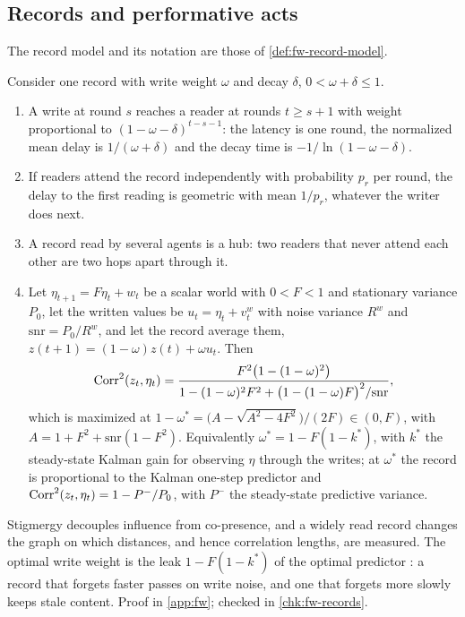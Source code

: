 \subsection{Records and performative acts}\label{sup:fw-records-and-performative-acts}

The record model and its notation are those of \cref{def:fw-record-model}.

\begin{proposition}\label{prop:fw-record-basics}
Consider one record with write weight $\omega$ and decay $\delta$, $0<\omega+\delta\le1$.
\begin{enumerate}
\item[(a)] A write at round $s$ reaches a reader at rounds $t\ge s+1$ with weight proportional to $(1-\omega-\delta)^{t-s-1}$: the latency is one round, the normalized mean delay is $1/(\omega+\delta)$ and the decay time is $-1/\ln(1-\omega-\delta)$.
\item[(b)] If readers attend the record independently with probability $p_r$ per round, the delay to the first reading is geometric with mean $1/p_r$, whatever the writer does next.
\item[(c)] A record read by several agents is a hub: two readers that never attend each other are two hops apart through it.
\item[(d)] Let $\eta_{t+1}=F\eta_t+w_t$ be a scalar world with $0<F<1$ and stationary variance $P_0$, let the written values be $u_t=\eta_t+v^w_t$ with noise variance $R^w$ and $\mathrm{snr}=P_0/R^w$, and let the record average them, $z(t+1)=(1-\omega)z(t)+\omega u_t$. Then
\begin{equation}\label{eq:fw-record-corr}
\operatorname{Corr}^2(z_t,\eta_t)=\frac{F^2\bigl(1-(1-\omega)^2\bigr)}{1-(1-\omega)^2F^2+\bigl(1-(1-\omega)F\bigr)^2/\mathrm{snr}},
\end{equation}
which is maximized at $1-\omega^\ast=\bigl(A-\sqrt{A^2-4F^2}\bigr)/(2F)\in(0,F)$, with $A=1+F^2+\mathrm{snr}(1-F^2)$. Equivalently $\omega^\ast=1-F(1-k^\ast)$, with $k^\ast$ the steady-state Kalman gain for observing $\eta$ through the writes; at $\omega^\ast$ the record is proportional to the Kalman one-step predictor and $\operatorname{Corr}^2(z_t,\eta_t)=1-P^-/P_0$, with $P^-$ the steady-state predictive variance.
\end{enumerate}
\end{proposition}

Stigmergy decouples influence from co-presence, and a widely read record changes the graph on which distances, and hence correlation lengths, are measured. The optimal write weight is the leak $1-F(1-k^\ast)$ of the optimal predictor \citep{kalman1960new}: a record that forgets faster passes on write noise, and one that forgets more slowly keeps stale content. Proof in \cref{app:fw}; checked in \cref{chk:fw-records}.

